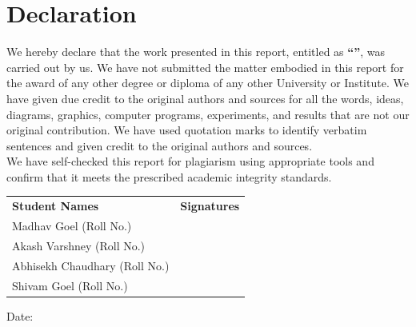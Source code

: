 \chapter*{Declaration}

\large { We hereby declare that the work presented in this report, entitled as {\textbf{``\reporttitle''}}, was carried out by us. We have not submitted the matter embodied in this report for the award of any other degree or diploma of any other University or Institute. We have given due credit to the original authors and sources for all the words, ideas, diagrams, graphics, computer programs, experiments, and results that are not our original contribution. We have used quotation marks to identify verbatim sentences and given credit to the original authors and sources.}\\

{ We have self-checked this report for plagiarism using appropriate tools and confirm that it meets the prescribed academic integrity standards.}\\


\vspace{3cm}

\noindent
\begin{tabular}{@{}ll}
    \textbf{Student Names} & \textbf{Signatures} \\[0.5cm]
    Madhav Goel (Roll No.) & \underline{\hspace{4cm}} \\[0.5cm]
    Akash Varshney (Roll No.) & \underline{\hspace{4cm}} \\[0.5cm]
    Abhisekh Chaudhary (Roll No.) & \underline{\hspace{4cm}} \\[0.5cm]
    Shivam Goel (Roll No.) & \underline{\hspace{4cm}} \\[0.5cm]
\end{tabular}

\vspace{1.5cm}
\noindent Date: \submissiondate
